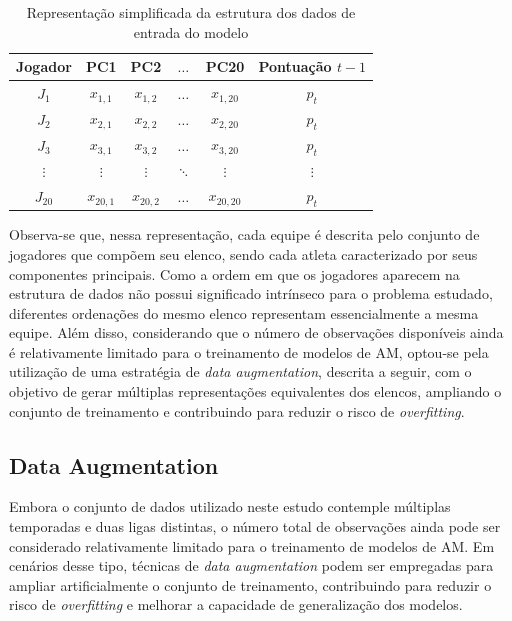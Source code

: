 \begin{table}[H]
\centering
\caption{Representação simplificada da estrutura dos dados de entrada do modelo}
\label{tab:estrutura_dados}
\begin{tabular}{cccccc}
\toprule
Jogador & PC1 & PC2 & $\dots$ & PC20 & Pontuação $t-1$ \\
\midrule
$J_1$  & $x_{1,1}$ & $x_{1,2}$ & $\dots$ & $x_{1,20}$ & $p_t$ \\
$J_2$  & $x_{2,1}$ & $x_{2,2}$ & $\dots$ & $x_{2,20}$ & $p_t$ \\
$J_3$  & $x_{3,1}$ & $x_{3,2}$ & $\dots$ & $x_{3,20}$ & $p_t$ \\
$\vdots$ & $\vdots$ & $\vdots$ & $\ddots$ & $\vdots$ & $\vdots$ \\
$J_{20}$ & $x_{20,1}$ & $x_{20,2}$ & $\dots$ & $x_{20,20}$ & $p_t$ \\
\bottomrule
\end{tabular}
\end{table}

Observa-se que, nessa representação, cada equipe é descrita pelo conjunto de jogadores que
compõem seu elenco, sendo cada atleta caracterizado por seus componentes principais. Como
a ordem em que os jogadores aparecem na estrutura de dados não possui significado intrínseco
para o problema estudado, diferentes ordenações do mesmo elenco representam essencialmente
a mesma equipe. Além disso, considerando que o número de observações disponíveis ainda é
relativamente limitado para o treinamento de modelos de AM, optou-se pela utilização de uma
estratégia de \textit{data augmentation}, descrita a seguir, com o objetivo de gerar múltiplas
representações equivalentes dos elencos, ampliando o conjunto de treinamento e contribuindo
para reduzir o risco de \textit{overfitting}.

\subsection{Data Augmentation}

Embora o conjunto de dados utilizado neste estudo contemple múltiplas temporadas e duas ligas distintas, 
o número total de observações ainda pode ser considerado relativamente limitado para o treinamento de 
modelos de AM. Em cenários desse tipo, técnicas de \textit{data augmentation} podem 
ser empregadas para ampliar artificialmente o conjunto de treinamento, contribuindo para reduzir o risco 
de \textit{overfitting} e melhorar a capacidade de generalização dos modelos.

